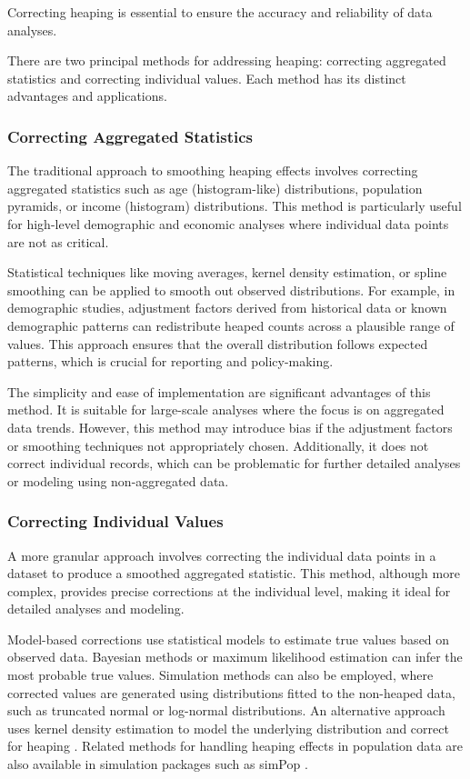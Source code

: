 \documentclass[pdflatex,sn-mathphys-num]{sn-jnl}%
\theoremstyle{thmstyleone}%
\theoremstyle{thmstyletwo}%
\theoremstyle{thmstylethree}%
\begin{document}
Correcting heaping is essential to ensure the accuracy and reliability of data analyses. 



There are two principal methods for addressing heaping: correcting aggregated statistics and correcting individual values. Each method has its distinct advantages and applications.

\subsubsection{Correcting Aggregated Statistics}

The traditional approach to smoothing heaping effects 
involves correcting aggregated statistics 
such as age (histogram-like) distributions, 
population pyramids, or income (histogram) 
distributions. 
This method is particularly useful for high-level demographic and economic analyses 
where individual data points are not as critical.

Statistical techniques like moving averages, kernel density estimation, or spline smoothing can be applied to smooth out observed distributions. For example, in demographic studies, adjustment factors derived from historical data or known demographic patterns can redistribute heaped counts across a plausible range of values. This approach ensures that the overall distribution follows expected patterns, which is crucial for reporting and policy-making.

The simplicity and ease of implementation are significant advantages of this method. 
It is suitable for large-scale analyses where the focus is on aggregated data trends. 
However, this method may introduce bias if the adjustment factors or smoothing techniques 
not appropriately chosen. Additionally, it does not correct individual records, 
which can be problematic for further detailed analyses or modeling using non-aggregated data.

\subsubsection{Correcting Individual Values}

A more granular approach involves correcting the individual data points in a dataset to produce a smoothed aggregated statistic. This method, although more complex, provides precise corrections at the individual level, making it ideal for detailed analyses and modeling.

Model-based corrections use statistical models to estimate true values based on observed data. Bayesian methods or maximum likelihood estimation can infer the most probable true values. Simulation methods can also be employed, where corrected values are generated using distributions fitted to the non-heaped data, such as truncated normal or log-normal distributions. An alternative approach uses kernel density estimation to model the underlying distribution and correct for heaping \citep{kernelheaping}. Related methods for handling heaping effects in population data are also available in simulation packages such as simPop \citep{simpop}.
\end{document}
